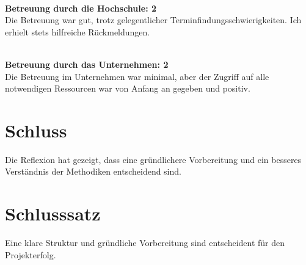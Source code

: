 \documentclass[biblatex]{lni}
\begin{document}
  \\ \textbf{Betreuung durch die Hochschule: 2}\\
  Die Betreuung war gut, trotz gelegentlicher Terminfindungsschwierigkeiten.
  Ich erhielt stets hilfreiche Rückmeldungen.

  \\ \textbf{Betreuung durch das Unternehmen: 2}\\
  Die Betreuung im Unternehmen war minimal,
  aber der Zugriff auf alle notwendigen Ressourcen war von Anfang an gegeben und positiv.

  \section{Schluss}

  Die Reflexion hat gezeigt, dass eine gründlichere Vorbereitung und ein besseres Verständnis der Methodiken entscheidend sind.

  \section{Schlusssatz}

  Eine klare Struktur und gründliche Vorbereitung sind entscheident für den Projekterfolg.
\end{document}
